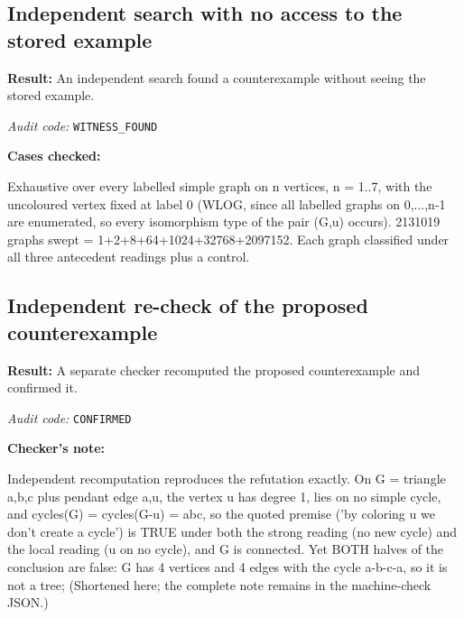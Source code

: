 \documentclass[11pt]{article}
\begin{document}
\subsection*{Independent search with no access to the stored example}
\textbf{Result:} An independent search found a counterexample without seeing the stored example.
\par\textit{Audit code:} \nolinkurl{WITNESS_FOUND}
\par\textbf{Cases checked:}
\begin{Vsrc}
Exhaustive over every labelled simple graph on n vertices, n = 1..7, with the uncoloured vertex fixed at label 0 (WLOG, since all labelled graphs on {0,...,n-1} are enumerated, so every isomorphism type of the pair (G,u) occurs). 2131019 graphs swept = 1+2+8+64+1024+32768+2097152. Each graph classified under all three antecedent readings plus a control.
\end{Vsrc}
\subsection*{Independent re-check of the proposed counterexample}
\textbf{Result:} A separate checker recomputed the proposed counterexample and confirmed it.
\par\textit{Audit code:} \nolinkurl{CONFIRMED}
\par\textbf{Checker's note:}
\begin{Vsrc}
Independent recomputation reproduces the refutation exactly. On G = triangle {a,b,c} plus pendant edge {a,u}, the vertex u has degree 1, lies on no simple cycle, and cycles(G) = cycles(G-u) = {abc}, so the quoted premise ('by coloring u we don't create a cycle') is TRUE under both the strong reading (no new cycle) and the local reading (u on no cycle), and G is connected. Yet BOTH halves of the conclusion are false: G has 4 vertices and 4 edges with the cycle a-b-c-a, so it is not a tree; (Shortened here; the complete note remains in the machine-check JSON.)
\end{Vsrc}
\end{document}
